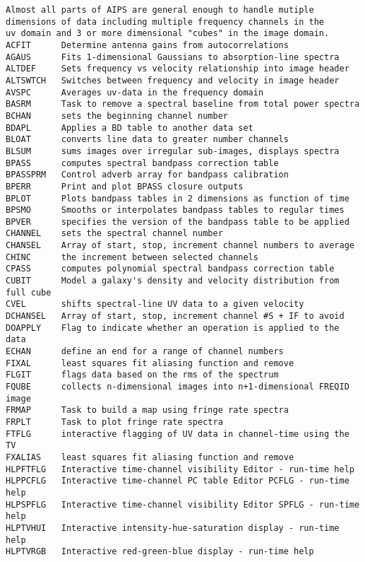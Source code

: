 \vskip 0.5pt
\bbve\begin{verbatim}
Almost all parts of AIPS are general enough to handle mutiple
dimensions of data including multiple frequency channels in the
uv domain and 3 or more dimensional "cubes" in the image domain.
ACFIT      Determine antenna gains from autocorrelations
AGAUS      Fits 1-dimensional Gaussians to absorption-line spectra
ALTDEF     Sets frequency vs velocity relationship into image header
ALTSWTCH   Switches between frequency and velocity in image header
AVSPC      Averages uv-data in the frequency domain
BASRM      Task to remove a spectral baseline from total power spectra
BCHAN      sets the beginning channel number
BDAPL      Applies a BD table to another data set
BLOAT      converts line data to greater number channels
BLSUM      sums images over irregular sub-images, displays spectra
BPASS      computes spectral bandpass correction table
BPASSPRM   Control adverb array for bandpass calibration
BPERR      Print and plot BPASS closure outputs
BPLOT      Plots bandpass tables in 2 dimensions as function of time
BPSMO      Smooths or interpolates bandpass tables to regular times
BPVER      specifies the version of the bandpass table to be applied
CHANNEL    sets the spectral channel number
CHANSEL    Array of start, stop, increment channel numbers to average
CHINC      the increment between selected channels
CPASS      computes polynomial spectral bandpass correction table
CUBIT      Model a galaxy's density and velocity distribution from full cube
CVEL       shifts spectral-line UV data to a given velocity
DCHANSEL   Array of start, stop, increment channel #S + IF to avoid
DOAPPLY    Flag to indicate whether an operation is applied to the data
ECHAN      define an end for a range of channel numbers
FIXAL      least squares fit aliasing function and remove
FLGIT      flags data based on the rms of the spectrum
FQUBE      collects n-dimensional images into n+1-dimensional FREQID image
FRMAP      Task to build a map using fringe rate spectra
FRPLT      Task to plot fringe rate spectra
FTFLG      interactive flagging of UV data in channel-time using the TV
FXALIAS    least squares fit aliasing function and remove
HLPFTFLG   Interactive time-channel visibility Editor - run-time help
HLPPCFLG   Interactive time-channel PC table Editor PCFLG - run-time help
HLPSPFLG   Interactive time-channel visibility Editor SPFLG - run-time help
HLPTVHUI   Interactive intensity-hue-saturation display - run-time help
HLPTVRGB   Interactive red-green-blue display - run-time help

\end{verbatim}
